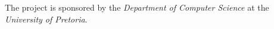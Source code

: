 The project is sponsored by the \emph{Department of Computer Science} at the \emph{University of Pretoria}.